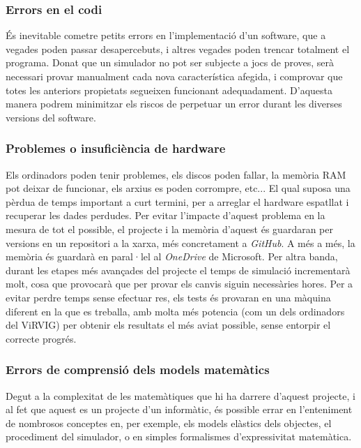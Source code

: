 \documentclass[a4paper]{report}
\begin{document}
	\subsubsection{Errors en el codi}
	És inevitable cometre petits errors en l'implementació d'un software, que a vegades poden passar desapercebuts, i altres vegades poden trencar totalment el programa.\newline
	Donat que un simulador no pot ser subjecte a jocs de proves, serà necessari provar manualment cada nova característica afegida, i comprovar que totes les anteriors propietats segueixen funcionant adequadament. D'aquesta manera podrem minimitzar els riscos de perpetuar un error durant les diverses versions del software.
	\subsubsection{Problemes o insuficiència de hardware}
	Els ordinadors poden tenir problemes, els discos poden fallar, la memòria RAM pot deixar de funcionar, els arxius es poden corrompre, etc... El qual suposa una pèrdua de temps important a curt termini, per a arreglar el hardware espatllat i recuperar les dades perdudes. \newline
	Per evitar l'impacte d'aquest problema en la mesura de tot el possible, el projecte i la memòria d'aquest és guardaran per versions en un repositori a la xarxa, més concretament a \textit{GitHub}. A més a més, la memòria és guardarà en paral·lel al \textit{OneDrive} de Microsoft.
	\newline
	Per altra banda, durant les etapes més avançades del projecte el temps de simulació incrementarà molt, cosa que provocarà que per provar els canvis siguin necessàries hores. \newline
	Per a evitar perdre temps sense efectuar res, els tests és provaran en una màquina diferent en la que es treballa, amb molta més potencia (com un dels ordinadors del ViRVIG) per obtenir els resultats el més aviat possible, sense entorpir el correcte progrés.
	\subsubsection{Errors de comprensió dels models matemàtics}
	Degut a la complexitat de les matemàtiques que hi ha darrere d'aquest projecte, i al fet que aquest es un projecte d'un informàtic, és possible errar en l'enteniment de nombrosos conceptes en, per exemple, els models elàstics dels objectes, el procediment del simulador, o en simples formalismes d'expressivitat matemàtica. \newline
\end{document}
